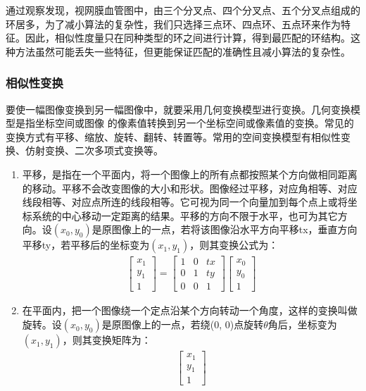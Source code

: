 通过观察发现，视网膜血管图中，由三个分叉点、四个分叉点、五个分叉点组成的环居多，为了减小算法的复杂性，我们只选择三点环、四点环、五点环来作为特征。因此，相似性度量只在同种类型的环之间进行计算，得到最匹配的环结构。这种方法虽然可能丢失一些特征，但更能保证匹配的准确性且减小算法的复杂性。

\subsubsection{相似性变换}
\label{}

要使一幅图像变换到另一幅图像中，就要采用几何变换模型进行变换。几何变换模型是指坐标空间或图像 的像素值转换到另一个坐标空间或像素值的变换。常见的变换方式有平移、缩放、旋转、翻转、转置等。常用的空间变换模型有相似性变换、仿射变换、二次多项式变换等。

\begin{enumerate}
\item 平移，是指在一个平面内，将一个图像上的所有点都按照某个方向做相同距离的移动。平移不会改变图像的大小和形状。图像经过平移，对应角相等、对应线段相等、对应点所连的线段相等。它可视为同一个向量加到每个点上或将坐标系统的中心移动一定距离的结果。平移的方向不限于水平，也可为其它方向。设$(x_0,y_0)$是原图像上的一点，若将该图像沿水平方向平移tx，垂直方向平移ty，若平移后的坐标变为$(x_1,y_1)$，则其变换公式为：
\begin{align}
\left[ \begin{array}{c}
x_1 \\
y_1 \\
1   
\end{array} \right]
=
\left[ \begin{array}{ccc}
1 & 0 & tx \\
0 & 1 & ty \\
0 & 0 & 1
\end{array} \right]
\left[ \begin{array}{c}
x_0 \\
y_0 \\
1
\end{array} \right]
\end{align}
\item 在平面内，把一个图像绕一个定点沿某个方向转动一个角度，这样的变换叫做旋转。设$(x_0,y_0)$是原图像上的一点，若绕(0, 0)点旋转$\theta$角后，坐标变为$(x_1,y_1)$，则其变换矩阵为：
\begin{align}
\left[ \begin{array}{c}
x_1 \\
y_1 \\
1   
\end{array} \right]

\end{align}
\end{enumerate}
